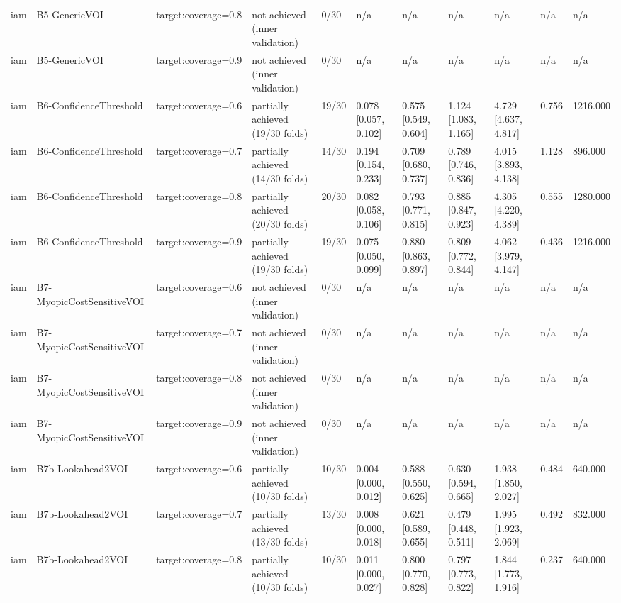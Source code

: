 \begin{table}[!ht]
{\begin{tabular}{lllllllllll}
iam & B5-GenericVOI & target:coverage=0.8 & not achieved (inner validation) & 0/30 & n/a & n/a & n/a & n/a & n/a & n/a \\
iam & B5-GenericVOI & target:coverage=0.9 & not achieved (inner validation) & 0/30 & n/a & n/a & n/a & n/a & n/a & n/a \\
iam & B6-ConfidenceThreshold & target:coverage=0.6 & partially achieved (19/30 folds) & 19/30 & 0.078 [0.057, 0.102] & 0.575 [0.549, 0.604] & 1.124 [1.083, 1.165] & 4.729 [4.637, 4.817] & 0.756 & 1216.000 \\
iam & B6-ConfidenceThreshold & target:coverage=0.7 & partially achieved (14/30 folds) & 14/30 & 0.194 [0.154, 0.233] & 0.709 [0.680, 0.737] & 0.789 [0.746, 0.836] & 4.015 [3.893, 4.138] & 1.128 & 896.000 \\
iam & B6-ConfidenceThreshold & target:coverage=0.8 & partially achieved (20/30 folds) & 20/30 & 0.082 [0.058, 0.106] & 0.793 [0.771, 0.815] & 0.885 [0.847, 0.923] & 4.305 [4.220, 4.389] & 0.555 & 1280.000 \\
iam & B6-ConfidenceThreshold & target:coverage=0.9 & partially achieved (19/30 folds) & 19/30 & 0.075 [0.050, 0.099] & 0.880 [0.863, 0.897] & 0.809 [0.772, 0.844] & 4.062 [3.979, 4.147] & 0.436 & 1216.000 \\
iam & B7-MyopicCostSensitiveVOI & target:coverage=0.6 & not achieved (inner validation) & 0/30 & n/a & n/a & n/a & n/a & n/a & n/a \\
iam & B7-MyopicCostSensitiveVOI & target:coverage=0.7 & not achieved (inner validation) & 0/30 & n/a & n/a & n/a & n/a & n/a & n/a \\
iam & B7-MyopicCostSensitiveVOI & target:coverage=0.8 & not achieved (inner validation) & 0/30 & n/a & n/a & n/a & n/a & n/a & n/a \\
iam & B7-MyopicCostSensitiveVOI & target:coverage=0.9 & not achieved (inner validation) & 0/30 & n/a & n/a & n/a & n/a & n/a & n/a \\
iam & B7b-Lookahead2VOI & target:coverage=0.6 & partially achieved (10/30 folds) & 10/30 & 0.004 [0.000, 0.012] & 0.588 [0.550, 0.625] & 0.630 [0.594, 0.665] & 1.938 [1.850, 2.027] & 0.484 & 640.000 \\
iam & B7b-Lookahead2VOI & target:coverage=0.7 & partially achieved (13/30 folds) & 13/30 & 0.008 [0.000, 0.018] & 0.621 [0.589, 0.655] & 0.479 [0.448, 0.511] & 1.995 [1.923, 2.069] & 0.492 & 832.000 \\
iam & B7b-Lookahead2VOI & target:coverage=0.8 & partially achieved (10/30 folds) & 10/30 & 0.011 [0.000, 0.027] & 0.800 [0.770, 0.828] & 0.797 [0.773, 0.822] & 1.844 [1.773, 1.916] & 0.237 & 640.000 \\

\end{tabular}}
\end{table}
